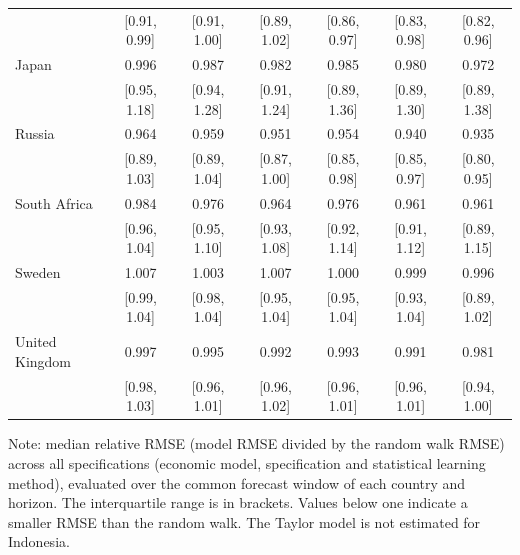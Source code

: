 \begin{table}[htbp]
{\begin{tabular*}{\textwidth}{@{\extracolsep{\fill}}lcccccc}
 & [0.91, 0.99] & [0.91, 1.00] & [0.89, 1.02] & [0.86, 0.97] & [0.83, 0.98] & [0.82, 0.96] \\
\addlinespace
Japan & 0.996 & 0.987 & 0.982 & 0.985 & 0.980 & 0.972 \\
 & [0.95, 1.18] & [0.94, 1.28] & [0.91, 1.24] & [0.89, 1.36] & [0.89, 1.30] & [0.89, 1.38] \\
\addlinespace
Russia & 0.964 & 0.959 & 0.951 & 0.954 & 0.940 & 0.935 \\
 & [0.89, 1.03] & [0.89, 1.04] & [0.87, 1.00] & [0.85, 0.98] & [0.85, 0.97] & [0.80, 0.95] \\
\addlinespace
South Africa & 0.984 & 0.976 & 0.964 & 0.976 & 0.961 & 0.961 \\
 & [0.96, 1.04] & [0.95, 1.10] & [0.93, 1.08] & [0.92, 1.14] & [0.91, 1.12] & [0.89, 1.15] \\
\addlinespace
Sweden & 1.007 & 1.003 & 1.007 & 1.000 & 0.999 & 0.996 \\
 & [0.99, 1.04] & [0.98, 1.04] & [0.95, 1.04] & [0.95, 1.04] & [0.93, 1.04] & [0.89, 1.02] \\
\addlinespace
United Kingdom & 0.997 & 0.995 & 0.992 & 0.993 & 0.991 & 0.981 \\
 & [0.98, 1.03] & [0.96, 1.01] & [0.96, 1.02] & [0.96, 1.01] & [0.96, 1.01] & [0.94, 1.00] \\
\bottomrule
\end{tabular*}
}
\par\noindent\begin{minipage}{\textwidth}
{\fontsize{8}{10}\selectfont Note: median relative RMSE (model RMSE divided by the random walk RMSE) across all specifications (economic model, specification and statistical learning method), evaluated over the common forecast window of each country and horizon. The interquartile range is in brackets. Values below one indicate a smaller RMSE than the random walk. The Taylor model is not estimated for Indonesia.}
\end{minipage}
\end{table}
